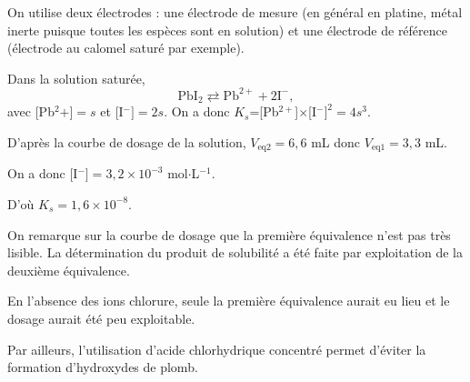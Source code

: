 \begin{solution}
\begin{questions}
\question On utilise deux électrodes : une électrode de mesure (en général en platine, métal inerte puisque toutes les espèces sont en solution) et une électrode de référence (électrode au calomel saturé par exemple).

\question Dans la solution saturée, 
$$\mathrm{PbI_2 \rightleftarrows Pb^{2+} + 2I^-},$$
avec [Pb$^2+] = s$ et [I$^-] = 2s$. On a donc $K_s$=[Pb$^{2+}$]$\times$[I$^-]^2 = 4s^3$.

D'après la courbe de dosage de la solution, $V_\text{eq2} = 6,6$ mL donc $V_\text{eq1} = 3,3$ mL.

On a donc [I$^-] = 3,2 \times 10^{-3}$ mol$\cdot$L$^{-1}$.

D'où $K_s = 1,6 \times 10 ^{-8}$.

\question On remarque sur la courbe de dosage que la première équivalence n'est pas très lisible. La détermination du produit de solubilité a été faite par exploitation de la deuxième équivalence.


En l'absence des ions chlorure, seule la première équivalence aurait eu lieu et le dosage aurait été peu exploitable.

Par ailleurs, l'utilisation d'acide chlorhydrique concentré permet d'éviter la formation d'hydroxydes de plomb.

\end{questions}


\end{solution}















